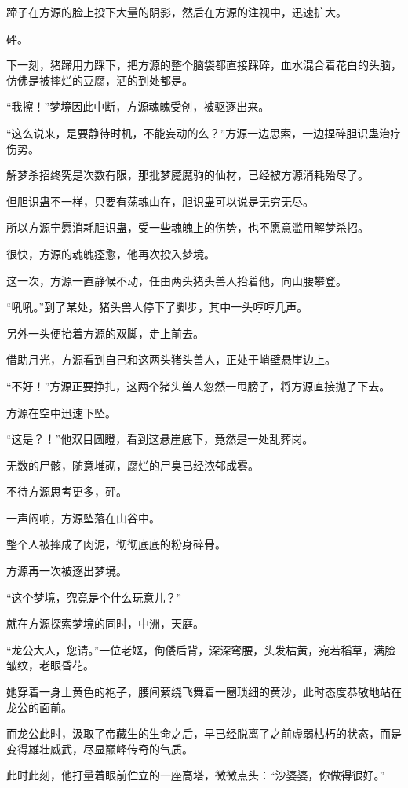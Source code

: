\begin{this_body}
蹄子在方源的脸上投下大量的阴影，然后在方源的注视中，迅速扩大。

砰。

下一刻，猪蹄用力踩下，把方源的整个脑袋都直接踩碎，血水混合着花白的头脑，仿佛是被摔烂的豆腐，洒的到处都是。

“我擦！”梦境因此中断，方源魂魄受创，被驱逐出来。

“这么说来，是要静待时机，不能妄动的么？”方源一边思索，一边捏碎胆识蛊治疗伤势。

解梦杀招终究是次数有限，那批梦魇魔驹的仙材，已经被方源消耗殆尽了。

但胆识蛊不一样，只要有荡魂山在，胆识蛊可以说是无穷无尽。

所以方源宁愿消耗胆识蛊，受一些魂魄上的伤势，也不愿意滥用解梦杀招。

很快，方源的魂魄痊愈，他再次投入梦境。

这一次，方源一直静候不动，任由两头猪头兽人抬着他，向山腰攀登。

“吼吼。”到了某处，猪头兽人停下了脚步，其中一头哼哼几声。

另外一头便抬着方源的双脚，走上前去。

借助月光，方源看到自己和这两头猪头兽人，正处于峭壁悬崖边上。

“不好！”方源正要挣扎，这两个猪头兽人忽然一甩膀子，将方源直接抛了下去。

方源在空中迅速下坠。

“这是？！”他双目圆瞪，看到这悬崖底下，竟然是一处乱葬岗。

无数的尸骸，随意堆砌，腐烂的尸臭已经浓郁成雾。

不待方源思考更多，砰。

一声闷响，方源坠落在山谷中。

整个人被摔成了肉泥，彻彻底底的粉身碎骨。

方源再一次被逐出梦境。

“这个梦境，究竟是个什么玩意儿？”

就在方源探索梦境的同时，中洲，天庭。

“龙公大人，您请。”一位老妪，佝偻后背，深深弯腰，头发枯黄，宛若稻草，满脸皱纹，老眼昏花。

她穿着一身土黄色的袍子，腰间萦绕飞舞着一圈琐细的黄沙，此时态度恭敬地站在龙公的面前。

而龙公此时，汲取了帝藏生的生命之后，早已经脱离了之前虚弱枯朽的状态，而是变得雄壮威武，尽显巅峰传奇的气质。

此时此刻，他打量着眼前伫立的一座高塔，微微点头：“沙婆婆，你做得很好。”


\end{this_body}
